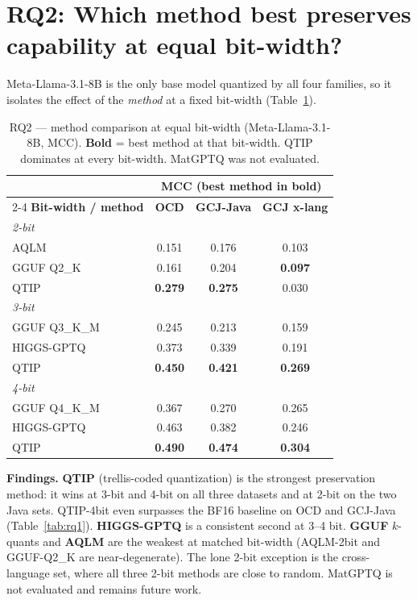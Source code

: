 \documentclass[11pt]{article}
\newcommand{\best}[1]{\textbf{#1}}
\begin{document}
\section{RQ2: Which method best preserves capability at equal bit-width?}
Meta-Llama-3.1-8B is the only base model quantized by all four families, so it
isolates the effect of the \emph{method} at a fixed bit-width
(Table~\ref{tab:rq2}).

\begin{table}[htbp]
  \centering
  \caption{RQ2 --- method comparison at equal bit-width (Meta-Llama-3.1-8B,
           MCC). \best{Bold} = best method at that bit-width. QTIP dominates at
           every bit-width. MatGPTQ was not evaluated.}
  \label{tab:rq2}
  \small
  \begin{tabular}{lccc}
    \toprule
    & \multicolumn{3}{c}{\textbf{MCC (best method in bold)}}\\
    \cmidrule(lr){2-4}
    \textbf{Bit-width / method} & \textbf{OCD} & \textbf{GCJ-Java} & \textbf{GCJ x-lang} \\
    \midrule
    \textit{2-bit} \\
    \quad AQLM         & 0.151 & 0.176 & 0.103 \\
    \quad GGUF Q2\_K   & 0.161 & 0.204 & \best{0.097} \\
    \quad QTIP         & \best{0.279} & \best{0.275} & 0.030 \\
    \midrule
    \textit{3-bit} \\
    \quad GGUF Q3\_K\_M & 0.245 & 0.213 & 0.159 \\
    \quad HIGGS-GPTQ    & 0.373 & 0.339 & 0.191 \\
    \quad QTIP          & \best{0.450} & \best{0.421} & \best{0.269} \\
    \midrule
    \textit{4-bit} \\
    \quad GGUF Q4\_K\_M & 0.367 & 0.270 & 0.265 \\
    \quad HIGGS-GPTQ    & 0.463 & 0.382 & 0.246 \\
    \quad QTIP          & \best{0.490} & \best{0.474} & \best{0.304} \\
    \bottomrule
  \end{tabular}
\end{table}

\noindent\textbf{Findings.} \textbf{QTIP} (trellis-coded quantization) is the
strongest preservation method: it wins at 3-bit and 4-bit on all three datasets
and at 2-bit on the two Java sets. QTIP-4bit even surpasses the BF16 baseline on
OCD and GCJ-Java (Table~\ref{tab:rq1}). \textbf{HIGGS-GPTQ} is a consistent
second at 3--4 bit. \textbf{GGUF} $k$-quants and \textbf{AQLM} are the weakest at
matched bit-width (AQLM-2bit and GGUF-Q2\_K are near-degenerate). The lone 2-bit
exception is the cross-language set, where all three 2-bit methods are close to
random. MatGPTQ is not evaluated and remains future work.
\end{document}

